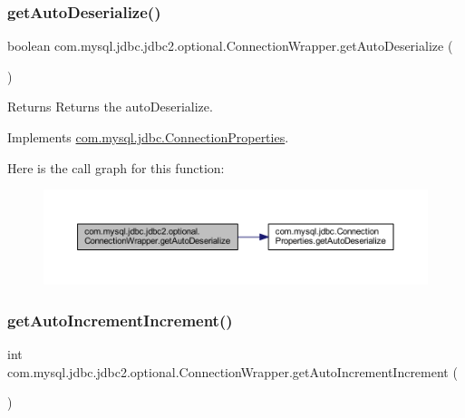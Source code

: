 \subsubsection{\texorpdfstring{get\+Auto\+Deserialize()}{getAutoDeserialize()}}
{\footnotesize\ttfamily boolean com.\+mysql.\+jdbc.\+jdbc2.\+optional.\+Connection\+Wrapper.\+get\+Auto\+Deserialize (\begin{DoxyParamCaption}{ }\end{DoxyParamCaption})}

\begin{DoxyReturn}{Returns}
Returns the auto\+Deserialize. 
\end{DoxyReturn}


Implements \mbox{\hyperlink{interfacecom_1_1mysql_1_1jdbc_1_1_connection_properties_aee9fe485d01db5f2c0094702cd16468e}{com.\+mysql.\+jdbc.\+Connection\+Properties}}.

Here is the call graph for this function\+:
\nopagebreak
\begin{figure}[H]
\begin{center}
\leavevmode
\includegraphics[width=350pt]{classcom_1_1mysql_1_1jdbc_1_1jdbc2_1_1optional_1_1_connection_wrapper_af2ea2c3cad85f247aee8c022f1b50808_cgraph}
\end{center}
\end{figure}
\mbox{\label{classcom_1_1mysql_1_1jdbc_1_1jdbc2_1_1optional_1_1_connection_wrapper_aabd8b0c60542e830e0fccfc8ed0ab005}} 
\subsubsection{\texorpdfstring{get\+Auto\+Increment\+Increment()}{getAutoIncrementIncrement()}}
{\footnotesize\ttfamily int com.\+mysql.\+jdbc.\+jdbc2.\+optional.\+Connection\+Wrapper.\+get\+Auto\+Increment\+Increment (\begin{DoxyParamCaption}{ }\end{DoxyParamCaption})}

